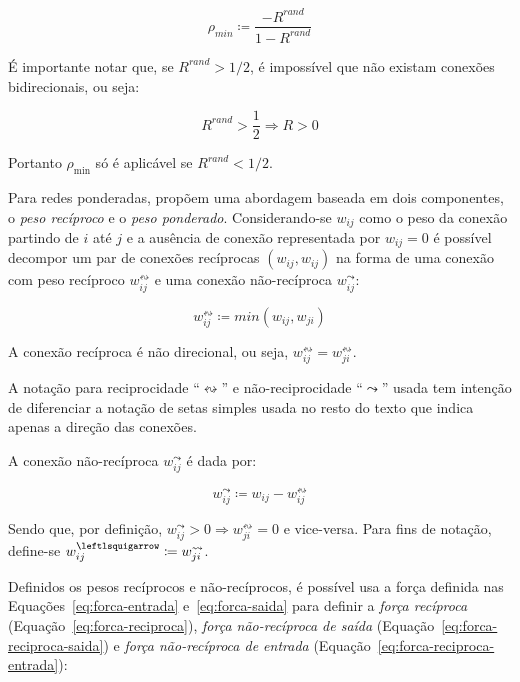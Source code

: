 \documentclass[12pt,a4paper]{article}
\theoremstyle{hypo}
\newcommand{\defn}{\coloneqq} %
\newcommand{\recin}[1]{#1^\leftlsquigarrow} %
\newcommand{\recout}[1]{#1^\leadsto} %
\newcommand{\recboth}[1]{#1^\leftrightsquigarrow} %
\begin{document}
\begin{equation}
\rho_\textit{min} \defn \frac{- R^\textit{rand}}{1 - R^\textit{rand}}
\end{equation}

É importante notar que, se $R^\textit{rand} > 1/2$, é impossível que não existam conexões bidirecionais, ou seja:

\begin{equation}
R^\textit{rand} > \frac{1}{2} \Rightarrow R > 0
\end{equation}

Portanto $\rho_\text{min}$ só é aplicável se $R^\textit{rand} < 1 / 2$.

Para redes ponderadas,  propõem uma abordagem baseada em dois componentes, o \textit{peso recíproco} e o \textit{peso ponderado}. Considerando-se $w_{ij}$ como o peso da conexão partindo de $i$ até $j$ e a ausência de conexão representada por $w_{ij} = 0$ é possível decompor um par de conexões recíprocas $(w_{ij}, w_{ij})$ na forma de uma conexão com peso recíproco $w^\leftrightsquigarrow_{ij}$ e uma conexão não-recíproca $w^\leadsto_{ij}$:

\begin{equation}
\recboth{w}_{ij} \defn min(w_{ij},w_{ji})
\end{equation}

A conexão recíproca é não direcional, ou seja, $\recboth{w}_{ij} = \recboth{w}_{ji}$.

A notação para reciprocidade \enquote{$\leftrightsquigarrow$} e não-reciprocidade \enquote{$\leadsto$} usada tem intenção de diferenciar a notação de setas simples usada no resto do texto que indica apenas a direção das conexões.

A conexão não-recíproca $\recout{w}_{ij}$ é dada por:
 
\begin{equation}
\recout{w}_{ij} \defn w_{ij} - \recboth{w}_{ij}
\end{equation}

Sendo que, por definição, $\recout{w}_{ij} > 0 \Rightarrow \recboth{w}_{ji} = 0$ e vice-versa. Para fins de notação, define-se $\recin{w}_{ij} \defn \recout{w}_{ji}$.

Definidos os pesos recíprocos e não-recíprocos, é possível usa a força definida nas Equações~\ref{eq:forca-entrada} e~\ref{eq:forca-saida} para definir a \textit{força recíproca} (Equação~\ref{eq:forca-reciproca}), \textit{força não-recíproca de saída}  (Equação~\ref{eq:forca-reciproca-saida}) e \textit{força não-recíproca de entrada}  (Equação~\ref{eq:forca-reciproca-entrada}):
\end{document}
